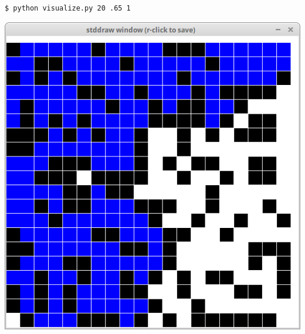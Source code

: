 \documentclass[8pt,a4paper,compress,handout]{beamer}
\begin{document}
\begin{frame}[fragile]
\begin{minipage}{160pt}
\begin{lstlisting}[language={}]
$ python visualize.py 20 .65 1
\end{lstlisting}
\end{minipage}%
\begin{minipage}{140pt}
\hfill \includegraphics[scale=0.15]{figures/percolation10.png}
\end{minipage}

\smallskip


\end{frame}
\end{document}
